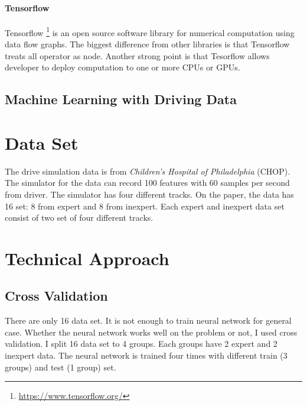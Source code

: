 \documentclass[draft,dvipsnames]{drexel-thesis}
\begin{document}
\begin{thesis}
\subsubsection{Tensorflow}
Tensorflow \footnote{\url{https://www.tensorflow.org/}} is an open source software library for numerical computation using data flow graphs. The biggest difference from other libraries is that Tensorflow treats all operator as node. Another strong point is that Tesorflow allows developer to deploy computation to one or more CPUs or GPUs. 


\section{Machine Learning with Driving Data}\label{sec:MLDD}

\chapter{Data Set}


The drive simulation data is from \textit{Children's Hospital of Philadelphia} (CHOP). The simulator for the data can record 100 features with 60 samples per second from driver. The simulator has four different tracks. On the paper, the data has 16 set: 8 from expert and 8 from inexpert. Each expert and inexpert data set consist of two set of four different tracks.

\chapter{Technical Approach}

\section{Cross Validation}
There are only 16 data set. It is not enough to train neural network for general case. Whether the neural network works well on the problem or not, I used cross validation. I split 16 data set to 4 groups. Each groups have 2 expert and 2 inexpert data. The neural network is trained four times with different train (3 groups) and test (1 group) set. 


\end{thesis}
\end{document}
